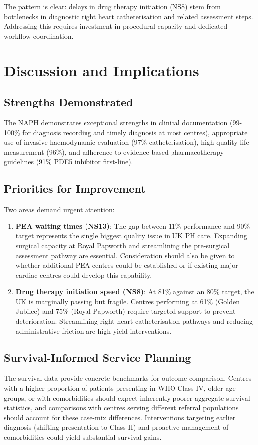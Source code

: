 \documentclass[12pt,a4paper]{article}
\begin{document}
\begin{itemize}
The pattern is clear: delays in drug therapy initiation (NS8) stem from bottlenecks in diagnostic right heart catheterisation and related assessment steps. Addressing this requires investment in procedural capacity and dedicated workflow coordination.

\section{Discussion and Implications}

\subsection{Strengths Demonstrated}
The NAPH demonstrates exceptional strengths in clinical documentation (99-100\% for diagnosis recording and timely diagnosis at most centres), appropriate use of invasive haemodynamic evaluation (97\% catheterisation), high-quality life measurement (96\%), and adherence to evidence-based pharmacotherapy guidelines (91\% PDE5 inhibitor first-line).

\subsection{Priorities for Improvement}
Two areas demand urgent attention:
\begin{enumerate}
    \item \textbf{PEA waiting times (NS13)}: The gap between 11\% performance and 90\% target represents the single biggest quality issue in UK PH care. Expanding surgical capacity at Royal Papworth and streamlining the pre-surgical assessment pathway are essential. Consideration should also be given to whether additional PEA centres could be established or if existing major cardiac centres could develop this capability.
    \item \textbf{Drug therapy initiation speed (NS8)}: At 81\% against an 80\% target, the UK is marginally passing but fragile. Centres performing at 61\% (Golden Jubilee) and 75\% (Royal Papworth) require targeted support to prevent deterioration. Streamlining right heart catheterisation pathways and reducing administrative friction are high-yield interventions.
\end{enumerate}

\subsection{Survival-Informed Service Planning}
The survival data provide concrete benchmarks for outcome comparison. Centres with a higher proportion of patients presenting in WHO Class IV, older age groups, or with comorbidities should expect inherently poorer aggregate survival statistics, and comparisons with centres serving different referral populations should account for these case-mix differences. Interventions targeting earlier diagnosis (shifting presentation to Class II) and proactive management of comorbidities could yield substantial survival gains.


\end{itemize}
\end{document}
